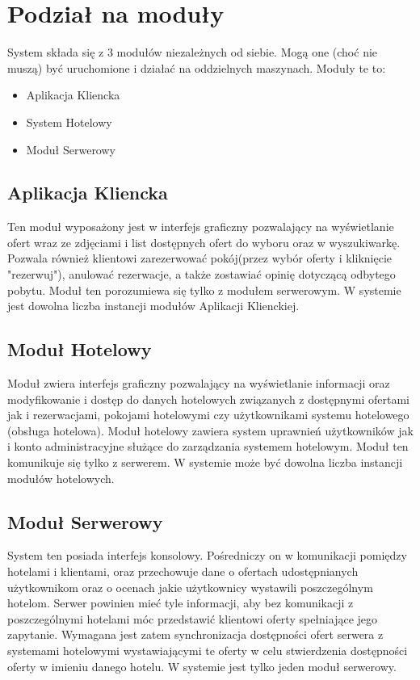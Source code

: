 \documentclass{article}
\begin{document}
\newpage
\section{Podział na moduły}
System składa się z 3 modułów niezależnych od siebie. Mogą one (choć nie muszą) być uruchomione i działać na oddzielnych maszynach.
Moduły te to:
\begin{itemize}
  \item Aplikacja Kliencka
  \item System Hotelowy
  \item Moduł Serwerowy
\end{itemize}

\subsection{Aplikacja Kliencka}
Ten moduł wyposażony jest w interfejs graficzny pozwalający na wyświetlanie ofert wraz ze zdjęciami i list dostępnych ofert do wyboru oraz w wyszukiwarkę. Pozwala również klientowi zarezerwować pokój(przez wybór oferty i kliknięcie "rezerwuj"), anulować rezerwacje, a także zostawiać opinię dotyczącą odbytego pobytu.
Moduł ten porozumiewa się tylko z modułem serwerowym.
W systemie jest dowolna liczba instancji modułów Aplikacji Klienckiej.

\subsection{Moduł Hotelowy}
Moduł zwiera interfejs graficzny pozwalający na wyświetlanie informacji oraz modyfikowanie i dostęp do danych hotelowych związanych z dostępnymi ofertami jak i rezerwacjami, pokojami hotelowymi czy użytkownikami systemu hotelowego (obsługa hotelowa). Moduł hotelowy zawiera system uprawnień użytkowników jak i konto administracyjne służące do zarządzania systemem hotelowym. Moduł ten komunikuje się tylko z serwerem.
W systemie może być dowolna liczba instancji modułów hotelowych.

\subsection{Moduł Serwerowy}
System ten posiada interfejs konsolowy. Pośredniczy on w komunikacji pomiędzy hotelami i klientami, oraz przechowuje dane o ofertach udostępnianych użytkownikom oraz o ocenach jakie użytkownicy wystawili poszczególnym hotelom. Serwer powinien mieć tyle informacji, aby bez komunikacji z poszczególnymi hotelami móc przedstawić klientowi oferty spełniające jego zapytanie. Wymagana jest zatem synchronizacja dostępności ofert serwera z systemami hotelowymi wystawiającymi te oferty w celu stwierdzenia dostępności oferty w imieniu danego hotelu.
W systemie jest tylko jeden moduł serwerowy.\\
\end{document}
